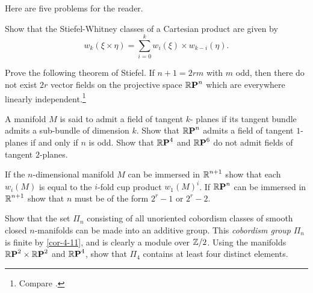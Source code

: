 Here are five problems for the reader.
\begin{problem}\label{prob-4-A}
	Show that the Stiefel-Whitney classes of a Cartesian
	product are given by 
	\[w_k(\xi\times \eta)=\sum_{i=0}^k w_i(\xi)\times w_{k-i}(\eta).\]
\end{problem}\bigskip
\begin{problem}\label{prob-4-B}
	Prove the following theorem of Stiefel. If $n + 1 = 2rm$
	with $m$ odd, then there do not exist $2r$ vector fields on the projective
	space $\boldsymbol{\mathbb{R}}\boldsymbol{\mathrm{P}}^{n}$ which are everywhere linearly independent.\footnote{Compare \cite{53,67,68}.}
\end{problem}\bigskip
\begin{problem}\label{prob-4-C}
	A manifold $M$ is said to admit a field of tangent $k$-
	planes if its tangent bundle admits a sub-bundle of dimension $k$. Show
	that $\boldsymbol{\mathbb{R}}\boldsymbol{\mathrm{P}}^{n}$ admits a field of tangent $1$-planes if and only if $n$ is odd. Show
	that $\boldsymbol{\mathbb{R}}\boldsymbol{\mathrm{P}}^{4}$ and $\boldsymbol{\mathbb{R}}\boldsymbol{\mathrm{P}}^{6}$ do not admit fields of tangent $2$-planes.
\end{problem}\bigskip
\begin{problem}\label{prob-4-D}
	If the $n$-dimensional manifold $M$ can be immersed in
	$\boldsymbol{\mathbb{R}}^{n+1}$ show that each $w_i(M)$ is equal to the $i$-fold cup product $w_1(M)^i$.
	If $\boldsymbol{\mathbb{R}}\boldsymbol{\mathrm{P}}^{n}$ can be immersed in $\boldsymbol{\mathbb{R}}^{n+1}$ show that $n$ must be of the form
	$2^r-1$ or $2^r-2$.
\end{problem}\bigskip
\begin{problem}\label{prob-4-E}
	Show that the set $\varPi_n$ consisting of all unoriented
	cobordism classes of smooth closed $n$-manifolds can be made into an
	additive group. This \textit{cobordism group} $\mathcal{\varPi}_n$ is finite by \cref{cor-4-11}, and is
	clearly a module over $\mathbb{Z}/2$. Using the manifolds $\boldsymbol{\mathbb{R}}\boldsymbol{\mathrm{P}}^{2}\times\boldsymbol{\mathbb{R}}\boldsymbol{\mathrm{P}}^{2}$ and $\boldsymbol{\mathbb{R}}\boldsymbol{\mathrm{P}}^{4}$,
	show that $\varPi_4$ contains at least four distinct elements.
\end{problem}